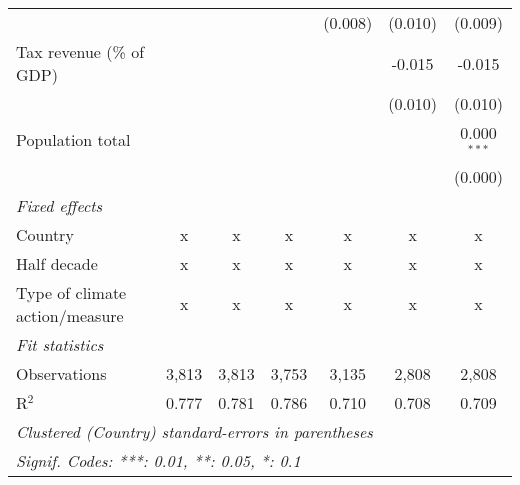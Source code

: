 \begin{tabular}{lcccccc}
                                                     &               &               &               & (0.008)        & (0.010)        & (0.009)\\   
   Tax revenue (\% of GDP)                           &               &               &               &                & -0.015         & -0.015\\   
                                                     &               &               &               &                & (0.010)        & (0.010)\\   
   Population total                                  &               &               &               &                &                & 0.000$^{***}$\\   
                                                     &               &               &               &                &                & (0.000)\\   
   \emph{Fixed effects}\\
   Country                                           & x             & x             & x             & x              & x              & x\\  
   Half decade                                       & x             & x             & x             & x              & x              & x\\  
   Type of climate action/measure                    & x             & x             & x             & x              & x              & x\\  
   \midrule \emph{Fit statistics}\\
   Observations                                      & 3,813         & 3,813         & 3,753         & 3,135          & 2,808          & 2,808\\  
   R$^2$                                             & 0.777         & 0.781         & 0.786         & 0.710          & 0.708          & 0.709\\  
   \midrule
   \multicolumn{7}{l}{\emph{Clustered (Country) standard-errors in parentheses}}\\
   \multicolumn{7}{l}{\emph{Signif. Codes: ***: 0.01, **: 0.05, *: 0.1}}\\
\end{tabular}
\par\endgroup


